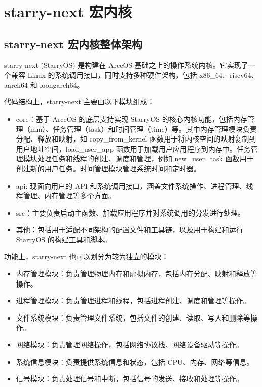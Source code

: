 
\chapter{starry-next 宏内核}

\section{starry-next 宏内核整体架构}

starry-next (StarryOS) 是构建在 ArceOS 基础之上的操作系统内核。它实现了一个兼容 Linux 的系统调用接口，同时支持多种硬件架构，包括 x86\_64、riscv64、aarch64 和 loongarch64。

代码结构上，starry-next 主要由以下模块组成：

\begin{itemize}
\item core：基于 ArceOS 的底层支持实现 StarryOS 的核心内核功能，包括内存管理（mm）、任务管理（task）和时间管理（time）等。其中内存管理模块负责分配、释放和映射，如 copy\_from\_kernel 函数用于将内核空间的映射复制到用户地址空间，load\_user\_app 函数用于加载用户应用程序到内存中。任务管理模块处理任务和线程的创建、调度和管理，例如 new\_user\_task 函数用于创建新的用户任务。时间管理模块管理系统时间和定时器。
\item api: 现面向用户的 API 和系统调用接口，涵盖文件系统操作、进程管理、线程管理、内存管理等多个方面。
\item src：主要负责启动主函数、加载应用程序并对系统调用的分发进行处理。
\item 其他：包括用于适配不同架构的配置文件和工具链，以及用于构建和运行 StarryOS 的构建工具和脚本。
\end{itemize}

功能上，starry-next 也可以划分为较为独立的模块：

\begin{itemize}
\item 内存管理模块：负责管理物理内存和虚拟内存，包括内存分配、映射和释放等操作。
\item 进程管理模块：负责管理进程和线程，包括进程创建、调度和管理等操作。
\item 文件系统模块：负责管理文件系统，包括文件的创建、读取、写入和删除等操作。
\item 网络模块：负责管理网络操作，包括网络协议栈、网络设备驱动等操作。
\item 系统信息模块：负责提供系统信息和状态，包括 CPU、内存、网络等信息。
\item 信号模块：负责处理信号和中断，包括信号的发送、接收和处理等操作。
\end{itemize}

